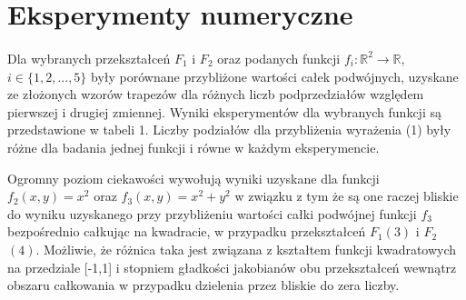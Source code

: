 \documentclass[a4paper,12pt]{article}
\begin{document}
\section*{Eksperymenty numeryczne}
\paragraph{ } Dla wybranych przekształceń $F_1$ i $F_2$ oraz podanych funkcji $f_i : \mathbb{R}^2 \xrightarrow{} \mathbb{R}$, $i \in \{1, 2, ..., 5\}$ były porównane przybliżone wartości całek podwójnych, uzyskane ze złożonych wzorów trapezów dla różnych liczb podprzedziałów względem pierwszej i drugiej zmiennej. Wyniki eksperymentów dla wybranych funkcji są przedstawione w tabeli 1. Liczby podziałów dla  przybliżenia wyrażenia (1) były różne dla badania jednej funkcji i równe w każdym eksperymencie.

Ogromny poziom ciekawości wywołują wyniki uzyskane dla funkcji $f_2(x,y) = x^2$ oraz $f_3(x,y) = x^2 + y^2$ w związku z tym że są one raczej bliskie do wyniku uzyskanego przy przybliżeniu wartości całki podwójnej funkcji $f_3$ bezpośrednio całkując na kwadracie, w przypadku przekształceń $F_1$$(3)$ i $F_2$$(4)$.  Możliwie, że różnica taka jest związana z kształtem funkcji kwadratowych na przedziale [-1,1] i stopniem gładkości jakobianów obu przekształceń wewnątrz obszaru całkowania w przypadku dzielenia przez bliskie do zera liczby. 
\end{document}
